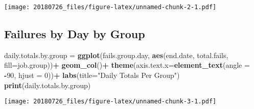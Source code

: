 \documentclass[]{article}
\newenvironment{Shaded}{\begin{snugshade}}{\end{snugshade}}
\newcommand{\KeywordTok}[1]{\textcolor[rgb]{0.13,0.29,0.53}{\textbf{#1}}}
\newcommand{\DataTypeTok}[1]{\textcolor[rgb]{0.13,0.29,0.53}{#1}}
\newcommand{\DecValTok}[1]{\textcolor[rgb]{0.00,0.00,0.81}{#1}}
\newcommand{\StringTok}[1]{\textcolor[rgb]{0.31,0.60,0.02}{#1}}
\newcommand{\OperatorTok}[1]{\textcolor[rgb]{0.81,0.36,0.00}{\textbf{#1}}}
\newcommand{\NormalTok}[1]{#1}
\begin{document}
\texttt{[image: 20180726\_files/figure-latex/unnamed-chunk-2-1.pdf]}

\subsection{Failures by Day by Group}\label{failures-by-day-by-group}

\begin{Shaded}
\begin{Highlighting}[]
\NormalTok{daily.totals.by.group =}\StringTok{ }
\StringTok{  }\KeywordTok{ggplot}\NormalTok{(fails.group.day, }\KeywordTok{aes}\NormalTok{(end.date, total.fails, }\DataTypeTok{fill=}\NormalTok{job.group))}\OperatorTok{+}
\StringTok{  }\KeywordTok{geom_col}\NormalTok{()}\OperatorTok{+}
\StringTok{  }\KeywordTok{theme}\NormalTok{(}\DataTypeTok{axis.text.x=}\KeywordTok{element_text}\NormalTok{(}\DataTypeTok{angle =} \OperatorTok{-}\DecValTok{90}\NormalTok{, }\DataTypeTok{hjust =} \DecValTok{0}\NormalTok{))}\OperatorTok{+}
\StringTok{  }\KeywordTok{labs}\NormalTok{(}\DataTypeTok{title=}\StringTok{"Daily Totals Per Group"}\NormalTok{)}
\KeywordTok{print}\NormalTok{(daily.totals.by.group)}
\end{Highlighting}
\end{Shaded}

\texttt{[image: 20180726\_files/figure-latex/unnamed-chunk-3-1.pdf]}
\end{document}

